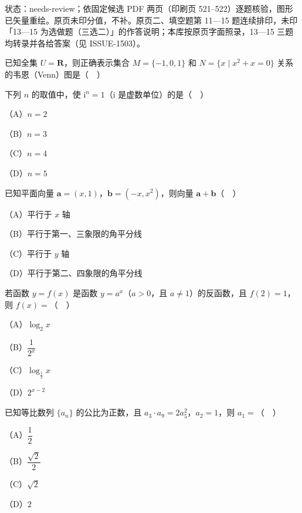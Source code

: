 

状态：needs-review；依固定候选 PDF 两页（印刷页 521–522）逐题核验，图形已矢量重绘。原页未印分值，不补。原页二、填空题第 11—15 题连续排印，未印「13—15 为选做题（三选二）」的作答说明；本库按原页字面照录，13—15 三题均转录并各给答案（见 ISSUE-1503）。


\Needspace{0.4\textheight}
\begingroup
\renewenvironment{question}{\Needspace{0.5\textheight}}{}
\begin{question}
已知全集 $U=\mathbf R$，则正确表示集合 $M=\{-1,0,1\}$ 和 $N=\{x\mid x^2+x=0\}$ 关系的韦恩（Venn）图是（　）
\nopagebreak[4]
\begin{center}\end{center}
\nopagebreak[4]
\end{question}
\endgroup
\begin{question}
下列 $n$ 的取值中，使 $\mathrm i^n=1$（$\mathrm i$ 是虚数单位）的是（　）

（A）$n=2$

（B）$n=3$

（C）$n=4$

（D）$n=5$

\end{question}
\begin{question}
已知平面向量 $\boldsymbol a=(x,1)$，$\boldsymbol b=(-x,x^2)$，则向量 $\boldsymbol a+\boldsymbol b$（　）

（A）平行于 $x$ 轴

（B）平行于第一、三象限的角平分线

（C）平行于 $y$ 轴

（D）平行于第二、四象限的角平分线

\end{question}
\begin{question}
若函数 $y=f(x)$ 是函数 $y=a^x$（$a>0$，且 $a\neq1$）的反函数，且 $f(2)=1$，则 $f(x)=$（　）

（A）$\log_2 x$

（B）$\dfrac{1}{2^x}$

（C）$\log_{\frac12}x$

（D）$2^{x-2}$

\end{question}
\begin{question}
已知等比数列 $\{a_n\}$ 的公比为正数，且 $a_3\cdot a_9=2a_5^2$，$a_2=1$，则 $a_1=$（　）

（A）$\dfrac12$

（B）$\dfrac{\sqrt2}{2}$

（C）$\sqrt2$

（D）$2$

\end{question}
